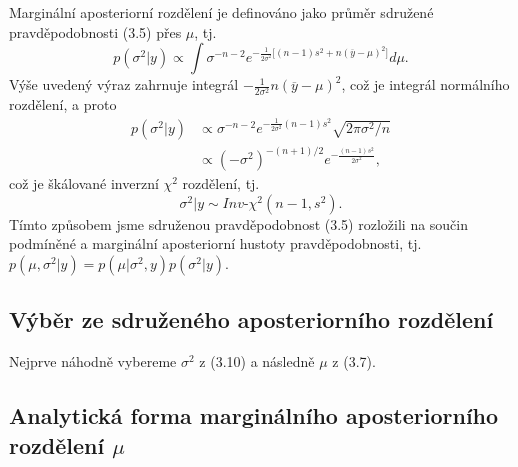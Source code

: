 Marginální aposteriorní rozdělení je definováno jako průměr sdružené pravděpodobnosti (3.5) přes $\mu$, tj.
\begin{equation}
p(\sigma^2 | y) \varpropto \int \sigma^{-n - 2} e^{-\frac{1}{2 \sigma ^ 2}\Big[ (n - 1) s^2 + n (\overline{y} - \mu) ^ 2 \Big]} d \mu.
\end{equation}
Výše uvedený výraz zahrnuje integrál $-\frac{1}{2 \sigma ^ 2} n (\overline{y} - \mu) ^ 2$, což je integrál normálního rozdělení, a proto
\begin{equation}
\begin{split}
p(\sigma^2 | y) & \varpropto \sigma^{-n - 2} e^{- \frac{1}{2 \sigma^2} (n - 1) s ^ 2 } \sqrt{2 \pi \sigma^2 / n}\\
 & \varpropto (- \sigma ^ 2) ^ {-(n + 1) / 2} e ^ {- \frac{(n - 1) s^2}{2 \sigma ^ 2}},
\end{split}
\end{equation}
což je škálované inverzní $\chi^2$ rozdělení, tj.
\begin{equation}
\sigma^2 | y \sim \textit{Inv-}\chi^2(n - 1, s^2).
\end{equation}
Tímto způsobem jsme sdruženou pravděpodobnost (3.5) rozložili na součin podmíněné a marginální aposteriorní hustoty pravděpodobnosti, tj. $p(\mu, \sigma^2 | y) = p(\mu | \sigma^2, y) p(\sigma^2 | y)$.

\subsection{Výběr ze sdruženého aposteriorního rozdělení}

Nejprve náhodně vybereme $\sigma^2$ z (3.10) a následně $\mu$ z (3.7).

\subsection{Analytická forma marginálního aposteriorního rozdělení $\mu$}


